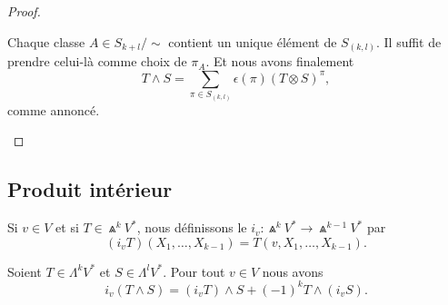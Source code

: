\begin{proof}
\begin{subproof}
		\spitem[Conclusion]
		Chaque classe \( A\in S_{k+l}/\sim\) contient un unique élément de \( S_{(k,l)}\). Il suffit de prendre celui-là comme choix de \( \pi_A\). Et nous avons finalement
		\begin{equation}
			T\wedge S=\sum_{\pi\in S_{(k,l)}}\epsilon(\pi)(T\otimes S)^{\pi},
		\end{equation}
		comme annoncé.
	\end{subproof}
\end{proof}


\subsection{Produit intérieur}

\begin{definition}
	Si \( v\in V\) et si \( T\in\Wedge^kV^*\), nous définissons le  \(i_v \colon \Wedge^kV^*\to \Wedge^{k-1}V^*  \) par
	\begin{equation}
		(i_vT)(X_1,\ldots,X_{k-1})=T(v,X_1,\ldots,X_{k-1}).
	\end{equation}
\end{definition}


\begin{proposition}		\label{PROPooYCRXooSOsqCb}
	Soient \( T\in \Lambda^kV^*\) et \( S\in \Lambda^lV^*\). Pour tout \( v\in V\) nous avons
	\begin{equation}		\label{EQooGMHPooBjTtly}
		i_v(T\wedge S)=(i_vT)\wedge S+(-1)^kT\wedge(i_vS).
	\end{equation}
\end{proposition}

